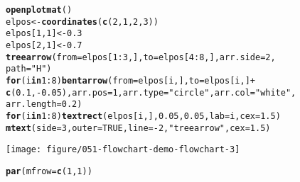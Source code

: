 \documentclass{article}\usepackage[]{graphicx}\usepackage[]{xcolor}
\makeatletter
\def\maxwidth{ %
  \ifdim\Gin@nat@width>\linewidth
    \linewidth
  \else
    \Gin@nat@width
  \fi
}
\newcommand{\hlnum}[1]{\textcolor[rgb]{0.686,0.059,0.569}{#1}}%
\newcommand{\hlsng}[1]{\textcolor[rgb]{0.192,0.494,0.8}{#1}}%
\newcommand{\hlopt}[1]{\textcolor[rgb]{0,0,0}{#1}}%
\newcommand{\hldef}[1]{\textcolor[rgb]{0.345,0.345,0.345}{#1}}%
\newcommand{\hlkwa}[1]{\textcolor[rgb]{0.161,0.373,0.58}{\textbf{#1}}}%
\newcommand{\hlkwb}[1]{\textcolor[rgb]{0.69,0.353,0.396}{#1}}%
\newcommand{\hlkwc}[1]{\textcolor[rgb]{0.333,0.667,0.333}{#1}}%
\newcommand{\hlkwd}[1]{\textcolor[rgb]{0.737,0.353,0.396}{\textbf{#1}}}%
\newenvironment{kframe}{%
 \def\at@end@of@kframe{}%
 \ifinner\ifhmode%
  \def\at@end@of@kframe{\end{minipage}}%
  \begin{minipage}{\columnwidth}%
 \fi\fi%
 \def\FrameCommand##1{\hskip\@totalleftmargin \hskip-\fboxsep
 \colorbox{shadecolor}{##1}\hskip-\fboxsep
     \hskip-\linewidth \hskip-\@totalleftmargin \hskip\columnwidth}%
 \MakeFramed {\advance\hsize-\width
   \@totalleftmargin\z@ \linewidth\hsize
   \@setminipage}}%
 {\par\unskip\endMakeFramed%
 \at@end@of@kframe}
\newenvironment{knitrout}{}{} %
\makeatother
\begin{document}
\begin{knitrout}
\begin{kframe}
\begin{alltt}
\hlkwd{openplotmat}\hldef{()}
\hldef{elpos} \hlkwb{<-} \hlkwd{coordinates}\hldef{(}\hlkwd{c}\hldef{(}\hlnum{2}\hldef{,} \hlnum{1}\hldef{,} \hlnum{2}\hldef{,} \hlnum{3}\hldef{))}
\hldef{elpos[}\hlnum{1}\hldef{,} \hlnum{1}\hldef{]} \hlkwb{<-} \hlnum{0.3}
\hldef{elpos[}\hlnum{2}\hldef{,} \hlnum{1}\hldef{]} \hlkwb{<-} \hlnum{0.7}
\hlkwd{treearrow}\hldef{(}\hlkwc{from} \hldef{= elpos[}\hlnum{1}\hlopt{:}\hlnum{3}\hldef{, ],} \hlkwc{to} \hldef{= elpos[}\hlnum{4}\hlopt{:}\hlnum{8}\hldef{, ],} \hlkwc{arr.side} \hldef{=} \hlnum{2}\hldef{,}
    \hlkwc{path} \hldef{=} \hlsng{"H"}\hldef{)}
\hlkwa{for} \hldef{(i} \hlkwa{in} \hlnum{1}\hlopt{:}\hlnum{8}\hldef{)} \hlkwd{bentarrow}\hldef{(}\hlkwc{from} \hldef{= elpos[i, ],} \hlkwc{to} \hldef{= elpos[i, ]} \hlopt{+}
    \hlkwd{c}\hldef{(}\hlnum{0.1}\hldef{,} \hlopt{-}\hlnum{0.05}\hldef{),} \hlkwc{arr.pos} \hldef{=} \hlnum{1}\hldef{,} \hlkwc{arr.type} \hldef{=} \hlsng{"circle"}\hldef{,} \hlkwc{arr.col} \hldef{=} \hlsng{"white"}\hldef{,}
    \hlkwc{arr.length} \hldef{=} \hlnum{0.2}\hldef{)}
\hlkwa{for} \hldef{(i} \hlkwa{in} \hlnum{1}\hlopt{:}\hlnum{8}\hldef{)} \hlkwd{textrect}\hldef{(elpos[i, ],} \hlnum{0.05}\hldef{,} \hlnum{0.05}\hldef{,} \hlkwc{lab} \hldef{= i,} \hlkwc{cex} \hldef{=} \hlnum{1.5}\hldef{)}
\hlkwd{mtext}\hldef{(}\hlkwc{side} \hldef{=} \hlnum{3}\hldef{,} \hlkwc{outer} \hldef{=} \hlnum{TRUE}\hldef{,} \hlkwc{line} \hldef{=} \hlopt{-}\hlnum{2}\hldef{,} \hlsng{"treearrow"}\hldef{,} \hlkwc{cex} \hldef{=} \hlnum{1.5}\hldef{)}
\end{alltt}
\end{kframe}
\texttt{[image: figure/051-flowchart-demo-flowchart-3]} 
\begin{kframe}\begin{alltt}
\hlkwd{par}\hldef{(}\hlkwc{mfrow} \hldef{=} \hlkwd{c}\hldef{(}\hlnum{1}\hldef{,} \hlnum{1}\hldef{))}


\end{alltt}
\end{kframe}
\end{knitrout}
\end{document}
